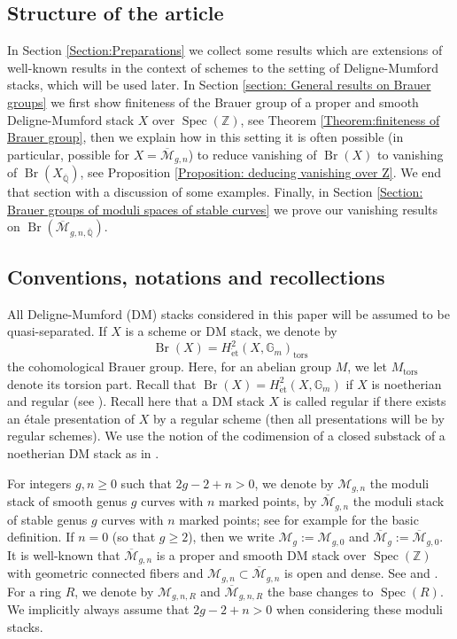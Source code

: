 \documentclass{amsart}
\theoremstyle{definition}
\theoremstyle{remark}
\DeclareMathOperator{\Spec}{Spec}
\DeclareMathOperator{\Br}{Br}
\DeclareMathOperator{\tors}{tors}
\newcommand{\ZZ}{\mathbb Z}
\newcommand{\et}{\operatorname{\acute{e}t}}%
\begin{document}
\subsection{Structure of the article}
In Section \ref{Section:Preparations} we collect some results which are extensions of well-known results in the context of schemes to the setting of Deligne-Mumford stacks, which will be used later. In Section \ref{section: General results on Brauer groups} we first show finiteness of the Brauer group of a proper and smooth Deligne-Mumford stack $X$ over $\Spec(\ZZ)$, see Theorem \ref{Theorem:finiteness of Brauer group}, then we explain how in this setting it is often possible
(in particular, possible for $X=\overline{\mathcal{M}}_{g,n}$) to reduce vanishing of $\Br(X)$ to vanishing of $\Br(X_{\overline{\mathbb{Q}}})$,
see Proposition \ref{Proposition: deducing vanishing over Z}. We end that section with a discussion of some examples. Finally, in Section \ref{Section: Brauer groups of moduli spaces of stable curves} we prove our vanishing results on $\Br(\overline{\mathcal{M}}_{g,n, \overline{\mathbb{Q}}})$.



\subsection{Conventions, notations and recollections}\label{Subsection:Notation and recollections}
All Deligne-Mumford (DM) stacks considered in this paper will be assumed to be quasi-separated.
If $X$ is a scheme or DM stack, we denote by
\[
\Br(X)=H^{2}_{\et}(X,\mathbb{G}_{m})_{\tors}
\]
the cohomological Brauer group.
Here, for an abelian group $M$, we let $M_{\tors}$ denote its torsion part.
Recall that $\Br(X)=H^{2}_{\et}(X,\mathbb{G}_{m})$ if $X$ is noetherian and regular (see \cite[Proposition 2.5]{AntieauMeierBrauerElliptic}).
Recall here that a DM stack $X$ is called regular if there exists an étale presentation of $X$ by a regular scheme (then all presentations will be by regular schemes). 
We use the notion of the codimension of a closed substack of a noetherian DM stack as in \cite[Definition 6.1]{osserman2013relativedimensionmorphismsdimension}.



For integers $g, n \geq 0$ such that $2g-2+n>0$,
we denote by $\mathcal{M}_{g,n}$ the moduli stack of smooth genus $g$ curves with $n$ marked points, by $\overline{\mathcal{M}}_{g,n}$ the moduli stack of stable genus $g$ curves with $n$ marked points; see \cite[Section 1]{Knudsen} for example for the basic definition.
If $n=0$ (so that $g \geq 2$), then we write
$\mathcal{M}_{g}:=\mathcal{M}_{g,0}$
and
$\overline{\mathcal{M}}_{g}:=\overline{\mathcal{M}}_{g,0}$.
It is well-known that
$\overline{\mathcal{M}}_{g,n}$
is a proper and smooth DM stack over $\Spec (\ZZ)$ with geometric connected fibers 
and $\mathcal{M}_{g,n} \subset \overline{\mathcal{M}}_{g,n}$ is open and dense.
See \cite{DeligneMumfordModuliCurves} and \cite{Knudsen}.
For a ring $R$, we denote by
$\mathcal{M}_{g,n, R}$
and
$\overline{\mathcal{M}}_{g,n, R}$
the base changes to $\Spec (R)$.
We implicitly always assume that $2g-2+n>0$ when considering these moduli stacks.
\end{document}
